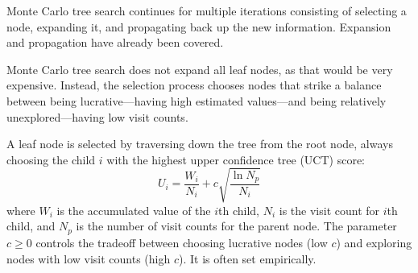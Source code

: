 \documentclass[10pt]{article}
\begin{document}
\begin{figure}[H]
\end{figure}

Monte Carlo tree search continues for multiple iterations consisting of selecting a node, expanding it, and propagating back up the new information.
Expansion and propagation have already been covered.

Monte Carlo tree search does not expand all leaf nodes, as that would be very expensive.
Instead, the selection process chooses nodes that strike a balance between being lucrative---having high estimated values---and being relatively unexplored---having low visit counts.

A leaf node is selected by traversing down the tree from the root node, always choosing the child $i$ with the highest upper confidence tree (UCT) score:
\[
U_i = \frac{W_i}{N_i} + c\sqrt{\frac{\ln N_p}{N_i}}
\]
where $W_i$ is the accumulated value of the $i$th child, $N_i$ is the visit count for $i$th child, and $N_p$ is the number of visit counts for the parent node.
The parameter $c \geq 0$ controls the tradeoff between choosing lucrative nodes (low $c$) and exploring nodes with low visit counts (high $c$).
It is often set empirically.
\end{document}
